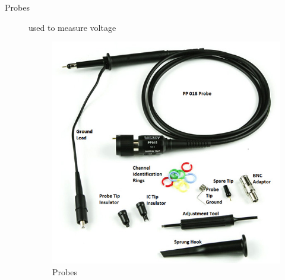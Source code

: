 \documentclass[a4paper, 10pt]{article}
\begin{document}
\begin{description}
				\item[Probes] used to measure voltage
					\begin{figure}[h!]
						\centering
						\includegraphics[width=\textwidth]{./images/Probe.jpeg}
						\caption{Probes}
						\label{fig:Probes}
					\end{figure}


\end{description}
\end{document}
